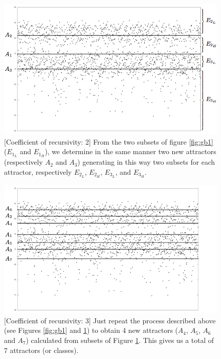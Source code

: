 \begin{figure}[!hbt]
	\begin{center}
		\includegraphics[scale=0.4]{img/1266}
		\caption{[Coefficient of recursivity: 2] From the two subsets of figure \ref{fig:gb1} ($E_{1_L}$ and $E_{1_H}$), we determine in the same manner two new attractors (respectively $A_2$ and $A_3$) generating in this way two subsets for each attractor, respectively $E_{2_L}$, $E_{2_H}$, $E_{3_L}$, and $E_{3_H}$.}
		\label{fig:gb2}
	\end{center}
\end{figure}

\begin{figure}[!hbt]
	\begin{center}
		\includegraphics[scale=0.4]{img/1267}
		\caption{[Coefficient of recursivity: 3] Just repeat the process described above (see Figures \ref{fig:gb1} and \ref{fig:gb2}) to obtain 4 new attractors ($A_4$, $A_5$, $A_6$ and $A_7$) calculated from subsets of Figure \ref{fig:gb2}. This gives us a total of 7 attractors (or classes).}
		\label{fig:gb3}
	\end{center}
\end{figure}

